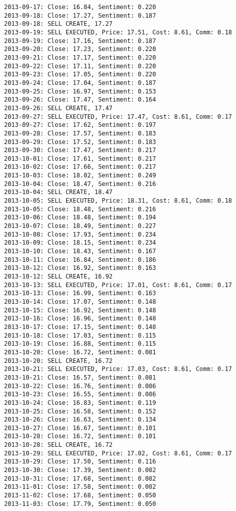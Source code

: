 \documentclass[11pt]{article}
\begin{document}
\begin{Verbatim}[commandchars=\\\{\}]
2013-09-17: Close: 16.84, Sentiment: 0.220
2013-09-18: Close: 17.27, Sentiment: 0.187
2013-09-18: SELL CREATE, 17.27
2013-09-19: SELL EXECUTED, Price: 17.51, Cost: 8.61, Comm: 0.18
2013-09-19: Close: 17.16, Sentiment: 0.187
2013-09-20: Close: 17.23, Sentiment: 0.220
2013-09-21: Close: 17.17, Sentiment: 0.220
2013-09-22: Close: 17.11, Sentiment: 0.220
2013-09-23: Close: 17.05, Sentiment: 0.220
2013-09-24: Close: 17.04, Sentiment: 0.187
2013-09-25: Close: 16.97, Sentiment: 0.153
2013-09-26: Close: 17.47, Sentiment: 0.164
2013-09-26: SELL CREATE, 17.47
2013-09-27: SELL EXECUTED, Price: 17.47, Cost: 8.61, Comm: 0.17
2013-09-27: Close: 17.62, Sentiment: 0.197
2013-09-28: Close: 17.57, Sentiment: 0.183
2013-09-29: Close: 17.52, Sentiment: 0.183
2013-09-30: Close: 17.47, Sentiment: 0.217
2013-10-01: Close: 17.61, Sentiment: 0.217
2013-10-02: Close: 17.66, Sentiment: 0.217
2013-10-03: Close: 18.02, Sentiment: 0.249
2013-10-04: Close: 18.47, Sentiment: 0.216
2013-10-04: SELL CREATE, 18.47
2013-10-05: SELL EXECUTED, Price: 18.31, Cost: 8.61, Comm: 0.18
2013-10-05: Close: 18.48, Sentiment: 0.216
2013-10-06: Close: 18.48, Sentiment: 0.194
2013-10-07: Close: 18.49, Sentiment: 0.227
2013-10-08: Close: 17.93, Sentiment: 0.234
2013-10-09: Close: 18.15, Sentiment: 0.234
2013-10-10: Close: 18.43, Sentiment: 0.167
2013-10-11: Close: 16.84, Sentiment: 0.186
2013-10-12: Close: 16.92, Sentiment: 0.163
2013-10-12: SELL CREATE, 16.92
2013-10-13: SELL EXECUTED, Price: 17.01, Cost: 8.61, Comm: 0.17
2013-10-13: Close: 16.99, Sentiment: 0.163
2013-10-14: Close: 17.07, Sentiment: 0.148
2013-10-15: Close: 16.92, Sentiment: 0.148
2013-10-16: Close: 16.96, Sentiment: 0.148
2013-10-17: Close: 17.15, Sentiment: 0.148
2013-10-18: Close: 17.03, Sentiment: 0.115
2013-10-19: Close: 16.88, Sentiment: 0.115
2013-10-20: Close: 16.72, Sentiment: 0.081
2013-10-20: SELL CREATE, 16.72
2013-10-21: SELL EXECUTED, Price: 17.03, Cost: 8.61, Comm: 0.17
2013-10-21: Close: 16.57, Sentiment: 0.081
2013-10-22: Close: 16.76, Sentiment: 0.086
2013-10-23: Close: 16.55, Sentiment: 0.086
2013-10-24: Close: 16.83, Sentiment: 0.119
2013-10-25: Close: 16.58, Sentiment: 0.152
2013-10-26: Close: 16.63, Sentiment: 0.134
2013-10-27: Close: 16.67, Sentiment: 0.101
2013-10-28: Close: 16.72, Sentiment: 0.101
2013-10-28: SELL CREATE, 16.72
2013-10-29: SELL EXECUTED, Price: 17.02, Cost: 8.61, Comm: 0.17
2013-10-29: Close: 17.50, Sentiment: 0.116
2013-10-30: Close: 17.39, Sentiment: 0.082
2013-10-31: Close: 17.68, Sentiment: 0.082
2013-11-01: Close: 17.58, Sentiment: 0.082
2013-11-02: Close: 17.68, Sentiment: 0.050
2013-11-03: Close: 17.79, Sentiment: 0.050

\end{Verbatim}
\end{document}
